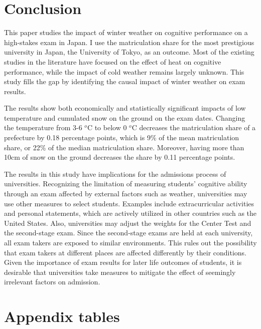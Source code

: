 \documentclass[12pt,letterpaper]{article}
\begin{document}
\section{Conclusion}\label{sec:conclusion}

This paper studies the impact of winter weather on cognitive performance on a high-stakes exam in Japan.
I use the matriculation share for the most prestigious university in Japan, the University of Tokyo, as an outcome.
Most of the existing studies in the literature have focused on the effect of heat on cognitive performance, while the impact of cold weather remains largely unknown.
This study fills the gap by identifying the causal impact of winter weather on exam results.

The results show both economically and statistically significant impacts of low temperature and cumulated snow on the ground on the exam dates.
Changing the temperature from 3-6 $^o$C to below 0 $^o$C decreases the matriculation share of a prefecture by 0.18 percentage points, which is 9\% of the mean matriculation share, or 22\% of the median matriculation share.
Moreover, having more than 10cm of snow on the ground decreases the share by 0.11 percentage points.

The results in this study have implications for the admissions process of universities.
Recognizing the limitation of measuring students' cognitive ability through an exam affected by external factors such as weather, universities may use other measures to select students.
Examples include extracurricular activities and personal statements, which are actively utilized in other countries such as the United States.
Also, universities may adjust the weights for the Center Test and the second-stage exam.
Since the second-stage exams are held at each university, all exam takers are exposed to similar environments.
This rules out the possibility that exam takers at different places are affected differently by their conditions.
Given the importance of exam results for later life outcomes of students, it is desirable that universities take measures to mitigate the effect of seemingly irrelevant factors on admission.

\clearpage



\appendix

\setcounter{figure}{0}
\setcounter{table}{0}
\renewcommand\thefigure{\Alph{section}.\arabic{figure}}
\renewcommand\thetable{\Alph{section}.\arabic{table}}
  
\section{Appendix tables}\label{sec:appendix_table}
\end{document}
